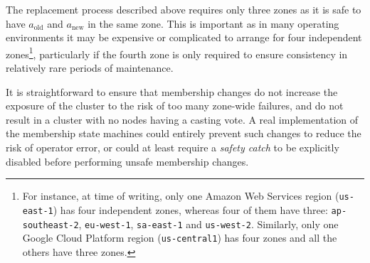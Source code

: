 \documentclass[journal]{IEEEtran}
\begin{document}
The replacement process described above requires only three zones as it is safe
to have $a_\mathrm{old}$ and $a_\mathrm{new}$ in the same zone. This is
important as in many operating environments it may be expensive or complicated
to arrange for four independent zones\footnote{For instance, at time of
writing, only one Amazon Web Services region (\texttt{us-east-1}) has four
independent zones, whereas four of them have three: \texttt{ap-southeast-2},
\texttt{eu-west-1}, \texttt{sa-east-1} and \texttt{us-west-2}. Similarly, only
one Google Cloud Platform region (\texttt{us-central1}) has four zones and all
the others have three zones.}, particularly if the fourth zone is only required
to ensure consistency in relatively rare periods of maintenance.

It is straightforward to ensure that membership changes do not increase the
exposure of the cluster to the risk of too many zone-wide failures, and do not
result in a cluster with no nodes having a casting vote. A real implementation
of the membership state machines could entirely prevent such changes to reduce
the risk of operator error, or could at least require a \textit{safety catch}
to be explicitly disabled before performing unsafe membership changes.



%
%

\end{document}
